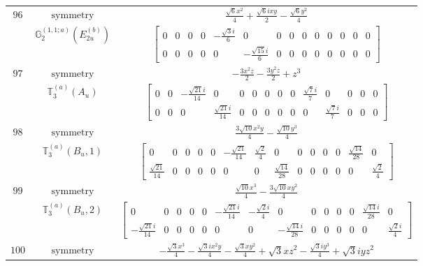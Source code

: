 \documentclass[fleqn,8pt,landscape]{jsarticle}
\begin{document}
\begin{longtable}{ccc}
$ 96 $ & $ \text{symmetry} $ & $ \frac{\sqrt{6} x^{2}}{4} + \frac{\sqrt{6} i x y}{2} - \frac{\sqrt{6} y^{2}}{4} $ \\
$  $ & $ \mathbb{G}_{2}^{(1,1;a)}(E_{2u}^{(b)}) $ & $ \begin{bmatrix} 0 & 0 & 0 & 0 & - \frac{\sqrt{3} i}{6} & 0 & 0 & 0 & 0 & 0 & 0 & 0 & 0 & 0 \\ 0 & 0 & 0 & 0 & 0 & - \frac{\sqrt{15} i}{6} & 0 & 0 & 0 & 0 & 0 & 0 & 0 & 0 \end{bmatrix} $ \\ \hline
$ 97 $ & $ \text{symmetry} $ & $ - \frac{3 x^{2} z}{2} - \frac{3 y^{2} z}{2} + z^{3} $ \\
$  $ & $ \mathbb{T}_{3}^{(a)}(A_{u}) $ & $ \begin{bmatrix} 0 & 0 & - \frac{\sqrt{21} i}{14} & 0 & 0 & 0 & 0 & 0 & 0 & \frac{\sqrt{7} i}{7} & 0 & 0 & 0 & 0 \\ 0 & 0 & 0 & \frac{\sqrt{21} i}{14} & 0 & 0 & 0 & 0 & 0 & 0 & \frac{\sqrt{7} i}{7} & 0 & 0 & 0 \end{bmatrix} $ \\ \hline
$ 98 $ & $ \text{symmetry} $ & $ \frac{3 \sqrt{10} x^{2} y}{4} - \frac{\sqrt{10} y^{3}}{4} $ \\
$  $ & $ \mathbb{T}_{3}^{(a)}(B_{u},1) $ & $ \begin{bmatrix} 0 & 0 & 0 & 0 & 0 & - \frac{\sqrt{21}}{14} & \frac{\sqrt{2}}{4} & 0 & 0 & 0 & 0 & 0 & \frac{\sqrt{14}}{28} & 0 \\ \frac{\sqrt{21}}{14} & 0 & 0 & 0 & 0 & 0 & 0 & \frac{\sqrt{14}}{28} & 0 & 0 & 0 & 0 & 0 & \frac{\sqrt{2}}{4} \end{bmatrix} $ \\ \hline
$ 99 $ & $ \text{symmetry} $ & $ \frac{\sqrt{10} x^{3}}{4} - \frac{3 \sqrt{10} x y^{2}}{4} $ \\
$  $ & $ \mathbb{T}_{3}^{(a)}(B_{u},2) $ & $ \begin{bmatrix} 0 & 0 & 0 & 0 & 0 & - \frac{\sqrt{21} i}{14} & - \frac{\sqrt{2} i}{4} & 0 & 0 & 0 & 0 & 0 & \frac{\sqrt{14} i}{28} & 0 \\ - \frac{\sqrt{21} i}{14} & 0 & 0 & 0 & 0 & 0 & 0 & - \frac{\sqrt{14} i}{28} & 0 & 0 & 0 & 0 & 0 & \frac{\sqrt{2} i}{4} \end{bmatrix} $ \\ \hline
$ 100 $ & $ \text{symmetry} $ & $ - \frac{\sqrt{3} x^{3}}{4} - \frac{\sqrt{3} i x^{2} y}{4} - \frac{\sqrt{3} x y^{2}}{4} + \sqrt{3} x z^{2} - \frac{\sqrt{3} i y^{3}}{4} + \sqrt{3} i y z^{2} $ \\

\end{longtable}
\end{document}

